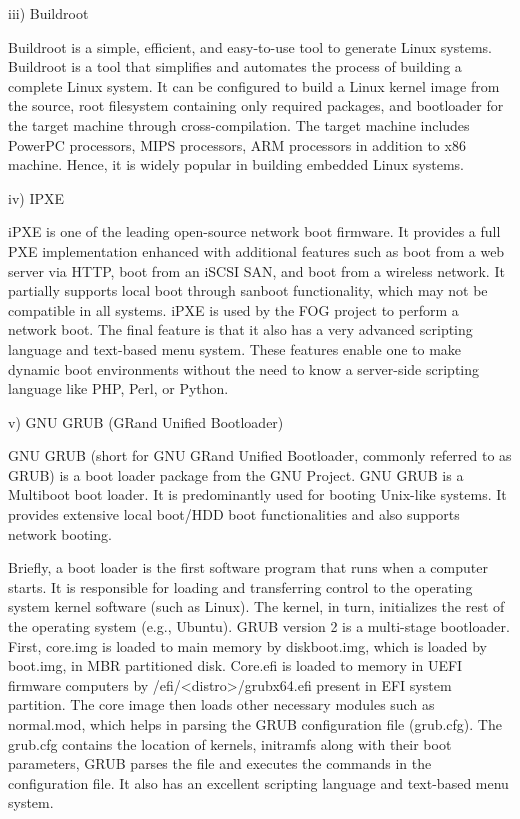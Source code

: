 \documentclass[a4paper,12pt]{article}
\begin{document}
iii) Buildroot 

Buildroot is a simple, efficient, and easy-to-use tool to generate Linux systems. Buildroot is a tool that simplifies and automates the process of building a complete Linux system. It can be configured to build a Linux kernel image from the source, root filesystem containing only required packages, and bootloader for the target machine through cross-compilation. The target machine includes PowerPC processors, MIPS processors, ARM processors in addition to x86 machine. Hence, it is widely popular in building embedded Linux systems. 

iv) IPXE

iPXE is one of the leading open-source network boot firmware. It provides a full PXE implementation enhanced with additional features such as boot from a web server via HTTP, boot from an iSCSI SAN, and boot from a wireless network. It partially supports local boot through sanboot functionality, which may not be compatible in all systems. iPXE is used by the FOG project to perform a network boot. The final feature is that it also has a very advanced scripting language and text-based menu system. These features enable one to make dynamic boot environments without the need to know a server-side scripting language like PHP, Perl, or Python.


v) GNU GRUB (GRand Unified Bootloader)

GNU GRUB (short for GNU GRand Unified Bootloader, commonly referred to as GRUB) is a boot loader package from the GNU Project. GNU GRUB is a Multiboot boot loader. It is predominantly used for booting Unix-like systems. It provides extensive local boot/HDD boot functionalities and also supports network booting. 

Briefly, a boot loader is the first software program that runs when a computer starts. It is responsible for loading and transferring control to the operating system kernel software (such as Linux). The kernel, in turn, initializes the rest of the operating system (e.g., Ubuntu). GRUB version 2 is a multi-stage bootloader. First, core.img is loaded to main memory by diskboot.img, which is loaded by boot.img,  in MBR partitioned disk. Core.efi is loaded to memory in UEFI firmware computers by /efi/<distro>/grubx64.efi present in EFI system partition. The core image then loads other necessary modules such as normal.mod, which helps in parsing the GRUB configuration file (grub.cfg). The grub.cfg contains the location of kernels, initramfs along with their boot parameters, GRUB parses the file and executes the commands in the configuration file. It also has an excellent scripting language and text-based menu system.
\end{document}
